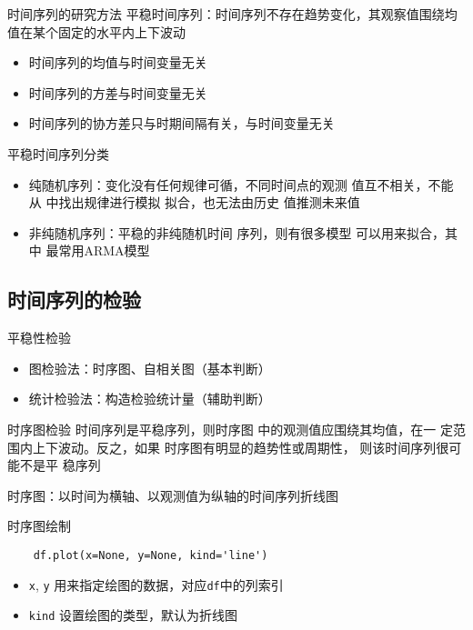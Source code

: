 \documentclass[t]{beamer}
\begin{document}
\begin{frame}[fragile]{时间序列的研究方法}
平稳时间序列：时间序列不存在趋势变化，其观察值围绕均值在某个固定的水平内上下波动
\begin{itemize}
    \item 时间序列的均值与时间变量无关
    \item 时间序列的方差与时间变量无关
    \item   时间序列的协方差只与时期间隔有关，与时间变量无关
\end{itemize}

\begin{block}{平稳时间序列分类}
   \begin{itemize}
    \item 纯随机序列：变化没有任何规律可循，不同时间点的观测
    值互不相关，不能从
    中找出规律进行模拟
    拟合，也无法由历史
    值推测未来值
    \item 非纯随机序列：平稳的非纯随机时间
    序列，则有很多模型
    可以用来拟合，其中
    最常用ARMA模型
\end{itemize} 
\end{block}

\end{frame}

\subsection{时间序列的检验}
\begin{frame}[fragile]{平稳性检验}
\begin{itemize}
    \item 图检验法：时序图、自相关图（基本判断）
    \item 统计检验法：构造检验统计量（辅助判断）
\end{itemize}

\end{frame}


\begin{frame}[fragile]{时序图检验}
    时间序列是平稳序列，则时序图
    中的观测值应围绕其均值，在一
    定范围内上下波动。反之，如果
    时序图有明显的趋势性或周期性，
    则该时间序列很可能不是平
    稳序列

时序图：以时间为横轴、以观测值为纵轴的时间序列折线图


\end{frame}


\begin{frame}[fragile]{时序图绘制}
\begin{lstlisting}
    df.plot(x=None, y=None, kind='line')
\end{lstlisting}
\begin{itemize}
    \item \verb|x|, \verb|y| 用来指定绘图的数据，对应\verb|df|中的{\color{red}列索引}
    \item \verb|kind| 设置绘图的类型，默认为折线图
\end{itemize}

\end{frame}
\end{document}
